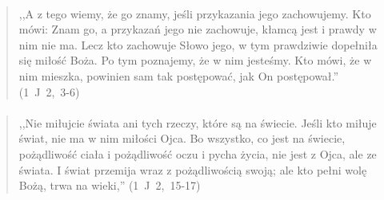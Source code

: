 \documentclass[10pt,a4paper,oneside]{article}
\begin{document}
\paragraph{}
\begin{quote}
,,A z tego wiemy, że go znamy, jeśli przykazania jego zachowujemy. Kto mówi: Znam go, a przykazań jego nie zachowuje, kłamcą jest i prawdy w nim nie ma. Lecz kto zachowuje Słowo jego, w tym prawdziwie dopełniła się miłość Boża. Po tym poznajemy, że w nim jesteśmy. Kto mówi, że w nim mieszka, powinien sam tak postępować, jak On postępował.'' \mbox{(1 J 2, 3-6)}
\end{quote}
\paragraph{}
\begin{quote}
,,Nie miłujcie świata ani tych rzeczy, które są na świecie. Jeśli kto miłuje świat, nie ma w nim miłości Ojca. Bo wszystko, co jest na świecie, pożądliwość ciała i pożądliwość oczu i pycha życia, nie jest z Ojca, ale ze świata. I świat przemija wraz z pożądliwością swoją; ale kto pełni wolę Bożą, trwa na wieki,'' \mbox{(1 J 2, 15-17)}
\end{quote}
\end{document}
